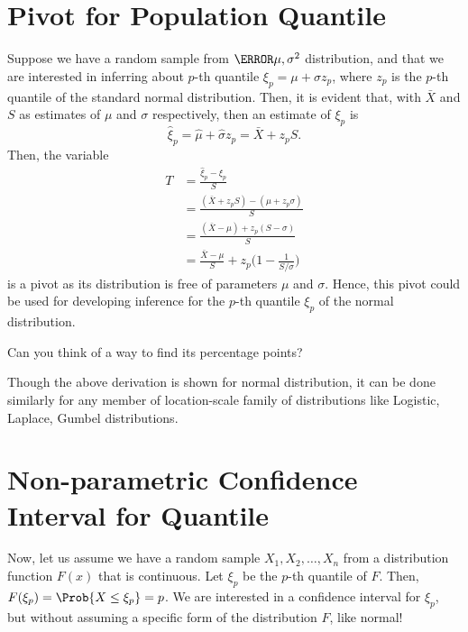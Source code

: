 \section*{Pivot for Population Quantile}
Suppose we have a random sample from $ \N{\mu,\sigma^2} $
distribution, and that we are interested in inferring about $ p $-th
quantile $ \xi_p=\mu+\sigma z_p $, where $ z_p $ is the $ p $-th quantile
of the standard normal distribution. Then, it is evident that, with
$ \bar{X} $ and $ S $ as estimates of $ \mu $ and $ \sigma $
respectively, then an estimate of $ \xi_p $ is
\[ \hat{\xi}_p=\hat{\mu}+\hat{\sigma}z_p=\bar{X}+z_p S. \]
Then, the variable
\begin{align*}
    T
     & =\frac{\hat{\xi}_p-\xi_p}{S}                                 \\
     & =\frac{(\bar{X}+z_p S)-(\mu+z_p\sigma)}{S}                   \\
     & =\frac{(\bar{X}-\mu)+z_p(S-\sigma)}{S}                       \\
     & =\frac{\bar{X}-\mu}{S}+z_p\biggl(1-\frac{1}{S/\sigma}\biggr)
\end{align*}
is a pivot as its distribution is free of parameters $ \mu $
and $ \sigma $. Hence, this pivot could be used for developing inference for
the $ p $-th quantile $ \xi_p $ of the normal distribution.
\begin{Exercise}{}{}
    Can you think of a way to find its percentage points?
\end{Exercise}
\begin{Remark}{}{}
    Though the above derivation is shown for normal distribution,
    it can be done similarly for any member of location-scale family
    of distributions like Logistic, Laplace, Gumbel distributions.
\end{Remark}
\section*{Non-parametric Confidence Interval for Quantile}
Now, let us assume we have a random sample
$ X_1,X_2,\ldots,X_n $ from a distribution function $ F(x) $
that is continuous. Let $ \xi_p $ be the $ p $-th quantile
of $ F $. Then,
$ F(\xi_p)=\Prob{X\le \xi_p}=p $. We are interested in a confidence interval
for $ \xi_p $, but without assuming a specific form of the
distribution $ F $, like normal!


